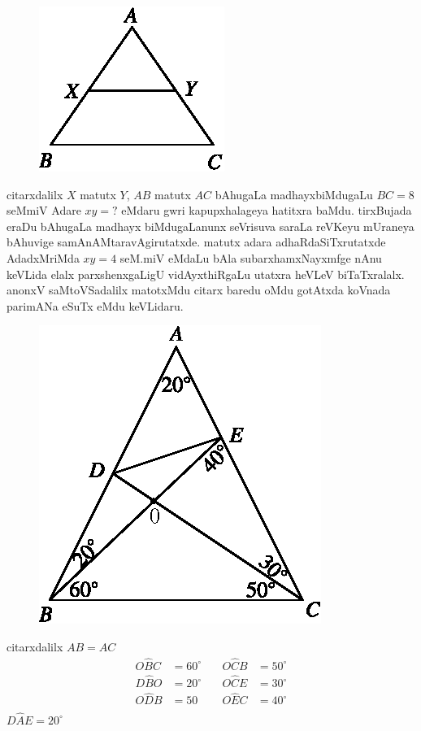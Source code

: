\begin{figure}[H]
\centering
\includegraphics{src/figures/m_179d.eps}
\end{figure}
citarxdalilx $X$ matutx $Y$, $AB$ matutx $AC$ bAhugaLa madhayxbiMdugaLu $BC=8$ seMmiV Adare $xy=?$ eMdaru gwri kapupxhalageya hatitxra baMdu. tirxBujada eraDu bAhugaLa madhayx biMdugaLanunx seVrisuva saraLa reVKeyu mUraneya bAhuvige samAnAMtaravAgirutatxde. matutx adara adhaRdaSiTxrutatxde AdadxMriMda $xy=4$ seM.miV eMdaLu bAla subarxhamxNayxmfge nAnu keVLida elalx parxshenxgaLigU vidAyxthiRgaLu utatxra heVLeV biTaTxralalx. anonxV saMtoVSadalilx matotxMdu citarx baredu oMdu gotAtxda koVnada parimANa eSuTx eMdu keVLidaru.
\begin{figure}[H]
\centering
\includegraphics{src/figures/m_181.eps}
\end{figure}

\begin{center} 
citarxdalilx $AB=AC$
$$
\begin{matrix}
O\hat{B}C &=60^\circ & \quad  O\hat{C}B &=50^\circ\\
D\hat{B}O &=20^\circ & \quad O\hat{C}E &=30^\circ\\
O\hat{D}B &=50 & \quad O\hat{E}C & =40^\circ\\
\end{matrix}
$$
$D\hat{A}E =20^\circ$
\end{center}

